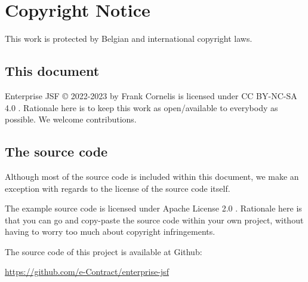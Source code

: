 %

\chapter*{Copyright Notice}
This work is protected by Belgian and international copyright laws.

\section*{This document}
Enterprise JSF © 2022-2023 by Frank Cornelis is licensed under CC BY-NC-SA 4.0 \cite{CCLicense}.
Rationale here is to keep this work as open/available to everybody as possible.
We welcome contributions.

\section*{The source code}
Although most of the source code is included within this document,
we make an exception with regards to the license of the source code itself.

The example source code is licensed under Apache License 2.0 \cite{ApacheLicense}.
Rationale here is that you can go and copy-paste the source code within your own project,
without having to worry too much about copyright infringements.

The source code of this project is available at Github:

\url{https://github.com/e-Contract/enterprise-jsf}